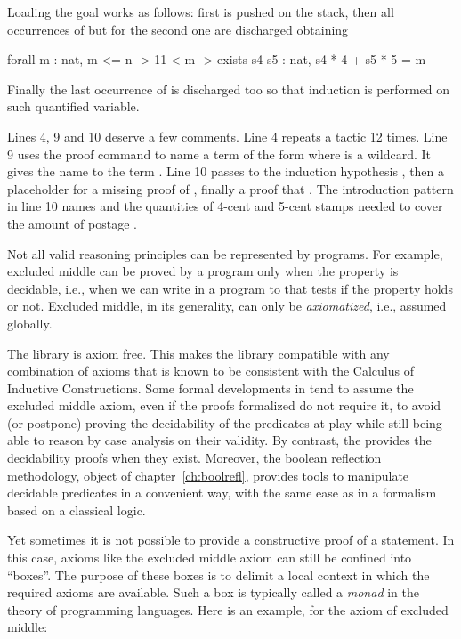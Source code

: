 Loading the goal works as follows: first  is pushed on
the stack, then all occurrences of  but for the second one are
discharged obtaining

\begin{coq}{}{}
forall m : nat,
  m <= n -> 11 < m -> exists s4 s5 : nat, s4 * 4 + s5 * 5 = m
\end{coq}
Finally the last occurrence of  is discharged too so that induction is performed
on such quantified variable.

Lines 4, 9 and 10 deserve a few comments.  Line 4 repeats a tactic
12 times.  Line 9 uses the  proof command to name  a
term of the form  where \C{_} is a wildcard. It gives the name
 to the term .  Line 10 passes to the induction
hypothesis , then a placeholder for a missing proof
of , finally a proof that .  The introduction
pattern in line 10 names  and  the quantities of
4-cent and 5-cent stamps needed to cover the amount of postage .


\label{sec:EM}

Not all valid reasoning principles can be represented by programs.
For example, excluded middle can be proved by a program only when
the property is decidable, i.e., when we can write in \Coq{} a program
to  that tests if the property holds or not.
Excluded middle, in its generality, can only be \emph{axiomatized},
i.e., assumed globally.

The \mcbMC{} library is axiom free.  This makes the library compatible
with any combination of axioms that is known to be consistent with the
Calculus of Inductive Constructions. Some formal developments in
\Coq{} tend to assume the excluded middle axiom, even if the proofs
formalized do not require it, to avoid (or postpone) proving the
decidability of the predicates at play while still being able to
reason by case analysis on their validity. By contrast, the \mcbMC{}
provides the decidability proofs when they exist. Moreover, the
boolean reflection methodology, object of chapter~\ref{ch:boolrefl},
provides tools to manipulate decidable predicates in a convenient way,
with the same ease as in a formalism based on a classical logic.

Yet sometimes it is not possible to provide a constructive proof of a
statement. In this case, axioms like the excluded middle axiom can
still be confined into ``boxes''. The purpose of these boxes is to
delimit a local context in which the required axioms are
available. Such a box is typically called a \emph{monad}
in the theory of programming languages. Here is an example, for the
axiom of excluded middle:

